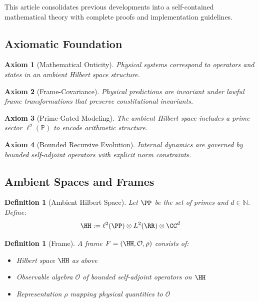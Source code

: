\documentclass[12]{amsart}
\newtheorem{axiom}{Axiom}
\theoremstyle{plain}
\newtheorem{definition}[theorem]{Definition}
\begin{document}
This article consolidates previous developments into a self-contained mathematical theory with complete proofs and implementation guidelines.

\subsection{Axiomatic Foundation}

\begin{axiom}[Mathematical Onticity]
Physical systems correspond to operators and states in an ambient Hilbert space structure.
\end{axiom}

\begin{axiom}[Frame-Covariance] 
Physical predictions are invariant under lawful frame transformations that preserve constitutional invariants.
\end{axiom}

\begin{axiom}[Prime-Gated Modeling]
The ambient Hilbert space includes a prime sector $\ell^2(\mathbb{P})$ to encode arithmetic structure.
\end{axiom}

\begin{axiom}[Bounded Recursive Evolution]
Internal dynamics are governed by bounded self-adjoint operators with explicit norm constraints.
\end{axiom}

\subsection{Ambient Spaces and Frames}

\begin{definition}[Ambient Hilbert Space]
Let $\PP$ be the set of primes and $d \in \mathbb{N}$. Define:
\[
\HH := \ell^2(\PP) \otimes L^2(\RR) \otimes \CC^d
\]
\end{definition}

\begin{definition}[Frame]
A \emph{frame} $F = (\HH, \mathcal{O}, \rho)$ consists of:
\begin{itemize}
    \item Hilbert space $\HH$ as above
    \item Observable algebra $\mathcal{O}$ of bounded self-adjoint operators on $\HH$  
    \item Representation $\rho$ mapping physical quantities to $\mathcal{O}$
\end{itemize}
\end{definition}
\end{document}
